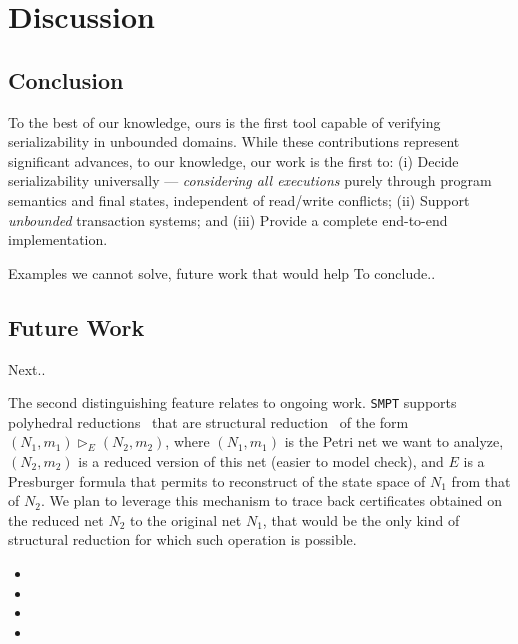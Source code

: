 \section{Discussion}
\label{sec:discussion}



\subsection{Conclusion}

To the best of our knowledge, ours is the first 
tool capable of verifying serializability in unbounded domains.
%
While these contributions represent significant advances, to our knowledge, our 
work is the first to:
(i) Decide serializability universally --- \textit{considering all executions} 
purely through program semantics and final states, independent of read/write 
conflicts; 
(ii) Support \textit{unbounded} transaction systems; and
(iii) Provide a complete end-to-end implementation.

Examples we cannot solve, future work that would help
To conclude..


\subsection{Future Work}
Next..

The second distinguishing feature relates to ongoing work. \texttt{SMPT} supports polyhedral reductions~\cite{AmBeDa21} that are structural reduction~\cite{Be87,BeLeDa20} of the form $(N_1, m_1) \vartriangleright_E (N_2, m_2)$, where $(N_1, m_1)$ is the Petri net we want to analyze, $(N_2, m_2)$ is a reduced version of this net (easier to model check), and $E$ is a Presburger formula that permits to reconstruct of the state space of $N_1$ from that of $N_2$. We plan to leverage this mechanism to trace back certificates obtained on the reduced net $N_2$ to the original net $N_1$, that would be the only kind of structural reduction for which such operation is possible.

\begin{itemize}
    \item {}
    \item {}
    \item {}
    \item {}
\end{itemize}